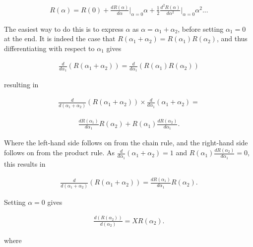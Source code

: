 \documentclass[fleqn, twocolumn, 10pt]{article}
\begin{document}
\begin{ceqn}
\begin{align*}
R(\alpha) = R(0) + \frac{dR(\alpha)}{d\alpha} \biggr\rvert_{\alpha = 0}\alpha + \frac{1}{2}\frac{d^2R(\alpha)}{d\alpha^2} \biggr\rvert_{\alpha = 0}\alpha^2 ...
\end{align*}
\end{ceqn}
The easiest way to do this is to express $\alpha$ as $\alpha = \alpha_1 + \alpha_2$, before setting $\alpha_1 = 0$ at the end. It is indeed the case that $R(\alpha_1 + \alpha_2) = R(\alpha_1)R(\alpha_2)$, and thus differentiating with respect to $\alpha_1$ gives

\begin{ceqn}
\begin{align*}
\frac{d}{d\alpha_1}(R(\alpha_1 + \alpha_2)) = \frac{d}{d\alpha_1}(R(\alpha_1)R(\alpha_2))
\end{align*}
\end{ceqn}
resulting in

\begin{ceqn}
\begin{align*}
\frac{d}{d(\alpha_1 + \alpha_2)}(R(\alpha_1 + \alpha_2))\times \frac{d}{d\alpha_1}(\alpha_1 + \alpha_2)=
\end{align*}
\end{ceqn}

\begin{ceqn}
\begin{align*}
\frac{dR(\alpha_1)}{d\alpha_1}R(\alpha_2) + R(\alpha_1)\frac{dR(\alpha_2)}{d\alpha_1}.
\end{align*}
\end{ceqn}
Where the left-hand side follows on from the chain rule, and the right-hand side follows on from the product rule. As $\frac{d}{d\alpha_1}(\alpha_1 + \alpha_2) = 1$ and $R(\alpha_1)\frac{dR(\alpha_2)}{d\alpha_1} = 0$, this results in

\begin{ceqn}
\begin{align*}
\frac{d}{d(\alpha_1 + \alpha_2)}(R(\alpha_1 + \alpha_2)) = \frac{dR(\alpha_1)}{d\alpha_1}R(\alpha_2).
\end{align*}
\end{ceqn}
Setting $\alpha = 0$ gives  

\begin{ceqn}
\begin{align*}
\frac{d(R(\alpha_2))}{d(\alpha_2)} = XR(\alpha_2).
\end{align*}
\end{ceqn}
where 
\end{document}
